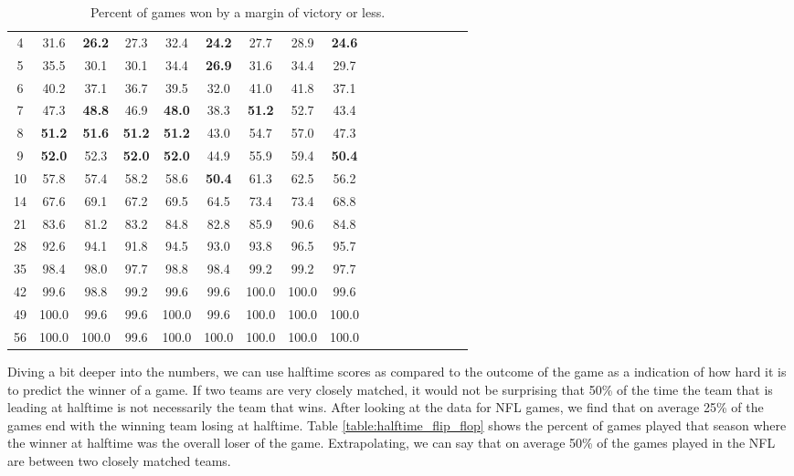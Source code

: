 \documentclass[11pt]{article}
\begin{document}
\begin{table}[!htb]
\begin{center}
\begin{tabular}{|c|c|c|c|c|c|c|c|c|c|c|c|c|c|c|c|c|}
4 & 31.6 & \textbf{26.2} & 27.3 & 32.4 & \textbf{24.2} & 27.7 & 28.9 & \textbf{24.6}\\
5 & 35.5 & 30.1 & 30.1 & 34.4 & \textbf{26.9} & 31.6 & 34.4 & 29.7\\
6 & 40.2 & 37.1 & 36.7 & 39.5 & 32.0 & 41.0 & 41.8 & 37.1\\
7 & 47.3 & \textbf{48.8} & 46.9 & \textbf{48.0} & 38.3 & \textbf{51.2} & 52.7 & 43.4\\
8 & \textbf{51.2} & \textbf{51.6} & \textbf{51.2} & \textbf{51.2} & 43.0 & 54.7 & 57.0 & 47.3\\
9 & \textbf{52.0} & 52.3 & \textbf{52.0} & \textbf{52.0} & 44.9 & 55.9 & 59.4 & \textbf{50.4}\\
10 & 57.8 & 57.4 & 58.2 & 58.6 & \textbf{50.4} & 61.3 & 62.5 & 56.2\\
14 & 67.6 & 69.1 & 67.2 & 69.5 & 64.5 & 73.4 & 73.4 & 68.8\\
21 & 83.6 & 81.2 & 83.2 & 84.8 & 82.8 & 85.9 & 90.6 & 84.8\\
28 & 92.6 & 94.1 & 91.8 & 94.5 & 93.0 & 93.8 & 96.5 & 95.7\\
35 & 98.4 & 98.0 & 97.7 & 98.8 & 98.4 & 99.2 & 99.2 & 97.7\\
42 & 99.6 & 98.8 & 99.2 & 99.6 & 99.6 & 100.0 & 100.0 & 99.6\\
49 & 100.0 & 99.6 & 99.6 & 100.0 & 99.6 & 100.0 & 100.0 & 100.0\\
56 & 100.0 & 100.0 & 99.6 & 100.0 & 100.0 & 100.0 & 100.0 & 100.0\\
\hline
\end{tabular}
\caption{Percent of games won by a margin of victory or less.}\label{table:margin_of_victory}
\end{center}
\end{table}

Diving a bit deeper into the numbers, we can use halftime scores as compared to the outcome of the game as a indication of how hard it is to predict the winner of a game. If two teams are very closely matched, it would not be surprising that 50\% of the time the team that is leading at halftime is not necessarily the team that wins. After looking at the data for NFL games, we find that on average 25\% of the games end with the winning team losing at halftime. Table \ref{table:halftime_flip_flop} shows the percent of games played that season where the winner at halftime was the overall loser of the game. Extrapolating, we can say that on average 50\% of the games played in the NFL are between two closely matched teams.
\end{document}

